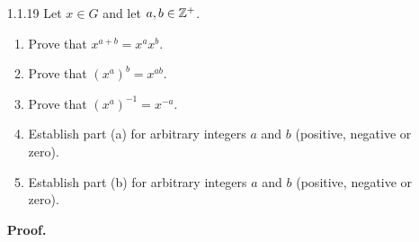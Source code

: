 \begin{enumerate}
      \textbf{Proof.} First assume that $xy = yx$. We then have that
      $yx = xy = 1xy = yy^{-1}xy$, so that $x = y^{-1}xy$ by left cancellation.
      Now assume that $y^{-1}xy = x$. Thus
      $x1 = x = y^{-1}xy = 1y^{-1}xy = xx^{-1}y^{-1}xy$, so that
      $1 = x^{-1}y^{-1}xy$ by left cancellation. Finally assume that
      $x^{-1}y^{-1}xy = 1$. Multiplying on the left by $yx$ will yield the
      equation $xy = yx$. \qed
   \item[1.1.19]  Let $x \in G$ and let $a, b \in \mathbb{Z}^+$.
                  \begin{enumerate}
                     \item Prove that $x^{a+b} = x^ax^b$.
                     \item Prove that $(x^a)^b = x^{ab}$.
                     \item Prove that $(x^a)^{-1} = x^{-a}$.
                     \item Establish part (a) for arbitrary integers $a$ and $b$
                           (positive, negative or zero).
                     \item Establish part (b) for arbitrary integers $a$ and $b$
                           (positive, negative or zero).
                  \end{enumerate}
               
      \textbf{Proof.}
      

\end{enumerate}
